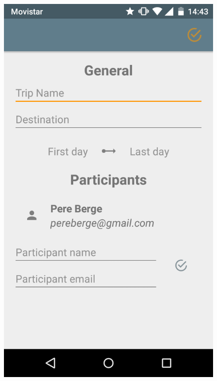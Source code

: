 \begin{itemize}
\begin{figure}[!h]
\centering
\includegraphics[scale=0.15]{Figures/cerarViatge.png}

\end{figure}
\end{itemize}
